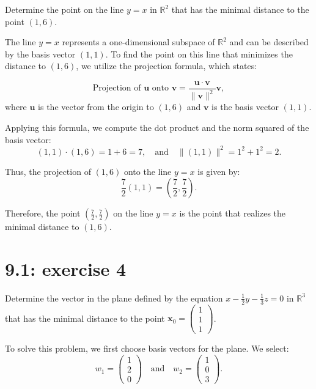 \documentclass{report}
\begin{document}
Determine the point on the line \( y = x \) in \(\mathbb{R}^2\) that has the minimal distance to the point \((1, 6)\). \\


\sol


The line \( y = x \) represents a one-dimensional subspace of \(\mathbb{R}^2\) and can be described by the basis vector \((1, 1)\). To find the point on this line that minimizes the distance to \((1, 6)\), we utilize the projection formula, which states:

\[
\text{Projection of } \mathbf{u} \text{ onto } \mathbf{v} = \frac{\mathbf{u} \cdot \mathbf{v}}{\|\mathbf{v}\|^2} \mathbf{v},
\]
where \(\mathbf{u}\) is the vector from the origin to \((1, 6)\) and \(\mathbf{v}\) is the basis vector \((1, 1)\).

Applying this formula, we compute the dot product and the norm squared of the basis vector:
\[
(1, 1) \cdot (1, 6) = 1 + 6 = 7, \quad \text{and} \quad \|(1, 1)\|^2 = 1^2 + 1^2 = 2.
\]

Thus, the projection of \((1, 6)\) onto the line \(y = x\) is given by:
\[
\frac{7}{2}(1, 1) = \left(\frac{7}{2}, \frac{7}{2}\right).
\]

Therefore, the point \(\left(\frac{7}{2}, \frac{7}{2}\right)\) on the line \(y = x\) is the point that realizes the minimal distance to \((1, 6)\).\\



\section*{9.1: exercise 4} 

Determine the vector in the plane defined by the equation \( x - \frac{1}{2} y - \frac{1}{3} z = 0 \) in \(\mathbb{R}^3\) that has the minimal distance to the point \( \mathbf{x}_0 = \begin{pmatrix} 1 \\ 1 \\ 1 \end{pmatrix} \).


\sol



To solve this problem, we first choose basis vectors for the plane. We select:
\[
w_1 = \begin{pmatrix} 1 \\ 2 \\ 0 \end{pmatrix} \quad \text{and} \quad w_2 = \begin{pmatrix} 1 \\ 0 \\ 3 \end{pmatrix}.
\]
\end{document}
